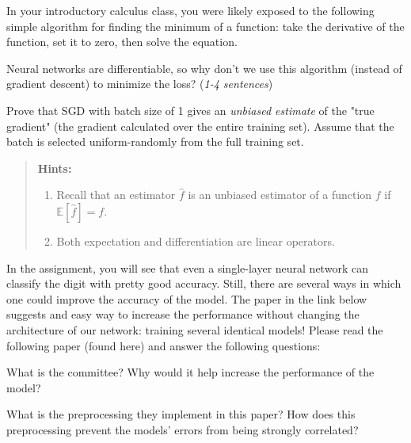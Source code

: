 \documentclass[11pt, answers]{exam}
\begin{document}
\begin{questions}
	\question
	In your introductory calculus class, you were likely exposed to the following simple algorithm for finding the minimum of a function: take the derivative of the function, set it to zero, then solve the equation.

	Neural networks are differentiable, so why don't we use this algorithm (instead of gradient descent) to minimize the loss? ({\it 1-4 sentences})

	\question
	Prove that SGD with batch size of 1 gives an {\it unbiased estimate} of the "true gradient" (the gradient calculated over the entire training set). Assume that the batch is selected uniform-randomly from the full training set.

	\begin{quote}
		{\bf Hints:}
		\begin{enumerate}
			\item Recall that an estimator $\hat{f}$ is an unbiased estimator of a function $f$ if $\mathbb {E}[\hat f] = f$.

			\item Both expectation and differentiation are linear operators.
		\end{enumerate}
	\end{quote}

	In the assignment, you will see that even a single-layer neural network can classify the digit with pretty good accuracy. Still, there are several ways in which one could improve the accuracy of the model. The paper in the link below suggests and easy way to increase the performance without changing the architecture of our network: training several identical models! Please read the following paper (found here) and answer the following questions:

	\question
	What is the committee? Why would it help increase the performance of the model?

	\question
	What is the preprocessing they implement in this paper? How does this preprocessing prevent the models' errors from being strongly correlated?

\end{questions}
\end{document}
